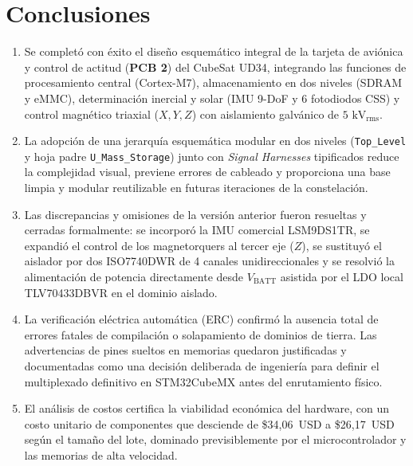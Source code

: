 \documentclass[11pt,a4paper]{article}
\begin{document}
\section{Conclusiones}
\begin{enumerate}
    \item Se completó con éxito el diseño esquemático integral de la tarjeta de aviónica y control de actitud (\textbf{PCB 2}) del CubeSat UD34, integrando las funciones de procesamiento central (Cortex-M7), almacenamiento en dos niveles (SDRAM y eMMC), determinación inercial y solar (IMU 9-DoF y 6 fotodiodos CSS) y control magnético triaxial ($X, Y, Z$) con aislamiento galvánico de $5\text{ kV}_{\text{rms}}$.
    \item La adopción de una jerarquía esquemática modular en dos niveles (\texttt{Top\_Level} y hoja padre \texttt{U\_Mass\_Storage}) junto con \emph{Signal Harnesses} tipificados reduce la complejidad visual, previene errores de cableado y proporciona una base limpia y modular reutilizable en futuras iteraciones de la constelación.
    \item Las discrepancias y omisiones de la versión anterior fueron resueltas y cerradas formalmente: se incorporó la IMU comercial LSM9DS1TR, se expandió el control de los magnetorquers al tercer eje ($Z$), se sustituyó el aislador por dos ISO7740DWR de 4 canales unidireccionales y se resolvió la alimentación de potencia directamente desde $V_{\text{BATT}}$ asistida por el LDO local TLV70433DBVR en el dominio aislado.
    \item La verificación eléctrica automática (ERC) confirmó la ausencia total de errores fatales de compilación o solapamiento de dominios de tierra. Las advertencias de pines sueltos en memorias quedaron justificadas y documentadas como una decisión deliberada de ingeniería para definir el multiplexado definitivo en STM32CubeMX antes del enrutamiento físico.
    \item El análisis de costos certifica la viabilidad económica del hardware, con un costo unitario de componentes que desciende de \$34{,}06~USD a \$26{,}17~USD según el tamaño del lote, dominado previsiblemente por el microcontrolador y las memorias de alta velocidad.
\end{enumerate}
\end{document}
